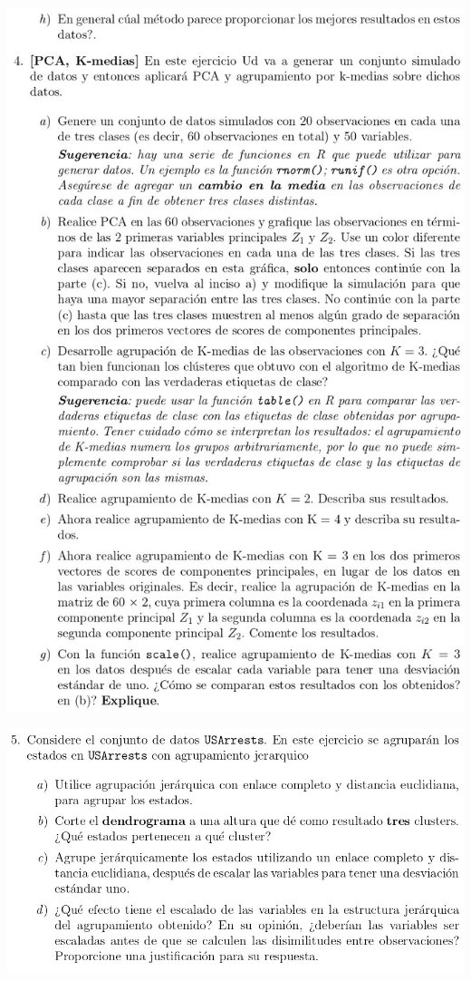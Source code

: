 \documentclass[
]{article}
\begin{document}
\begin{center}\includegraphics[width=0.9\linewidth]{Trabajo1_Mod3_Sem0220_page-0003} \end{center}

\begin{center}\includegraphics[width=0.9\linewidth]{Trabajo1_Mod3_Sem0220_page-0004} \end{center}
\end{document}
